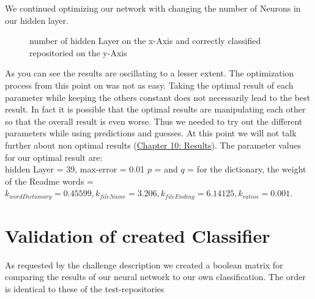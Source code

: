 \documentclass[paper=A4,pagesize=auto,12pt,headinclude=true,footinclude=true,BCOR=0mm,DIV=calc]{scrartcl}
\begin{document}
	We continued optimizing our network with changing the number of Neurons in our hidden layer.
		\begin{figure}[H]
			\caption{number of hidden Layer on the x-Axis and correctly classified repositoried on the y-Axis}
		\end{figure}
	 

	As you can see the results are oscillating to a lesser extent. The optimization process from this point on was not as easy. Taking the optimal result of each parameter while keeping the others constant does not necessarily lead to the best result. In fact it is possible that the optimal results are manipulating each other so that the overall result is even worse. 
	Thus we needed to try out the different parameters while using predictions and guesses. At this point we will not talk further about non optimal results (\hyperref[src:recordingsOfResults]{Chapter 10: Results}). 
	The parameter values for our optimal result are:\\
	 hidden Layer = 39, max-error = 0.01 $p$ =  and $q$ = for the dictionary, the weight of the Readme words =  $k_{wordDictionary} = 0.45599, k_{fileName} = 3.206 , k_{fileEnding}= 6.14125, k_{ratios} = 0.001$.
	
	\section{Validation of created Classifier}
	As requested by the challenge description we created a boolean matrix for comparing the results of our neural network to our own classification. The order is identical to these of the test-repositories \\
	
\end{document}
